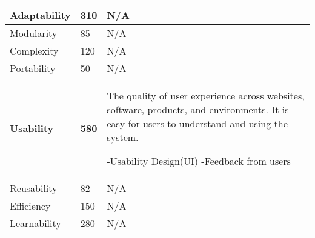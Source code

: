 \begin{center}
\begin{tabular}{| p{4cm} | p{4cm} | p{6cm} |}
			Adaptability & 310 &  N\slash A \\ \hline
			
			Modularity & 85 & N\slash A \\ \hline
			
			Complexity & 120 & N\slash A \\ \hline
			
			Portability & 50 & N\slash A \\ \hline
			
			\textbf{Usability} & \textbf{580} & The quality of user experience across websites, software, products, and environments. It is easy for users to understand and using the system.

			-Usability Design(UI)
			-Feedback from users \\ \hline
			
			Reusability & 82 & N\slash A \\ \hline
			
			Efficiency & 150 & N\slash A \\ \hline
			
			Learnability & 280 & N\slash A \\ 
			
   		 \hline
	\end{tabular}
\end{center}